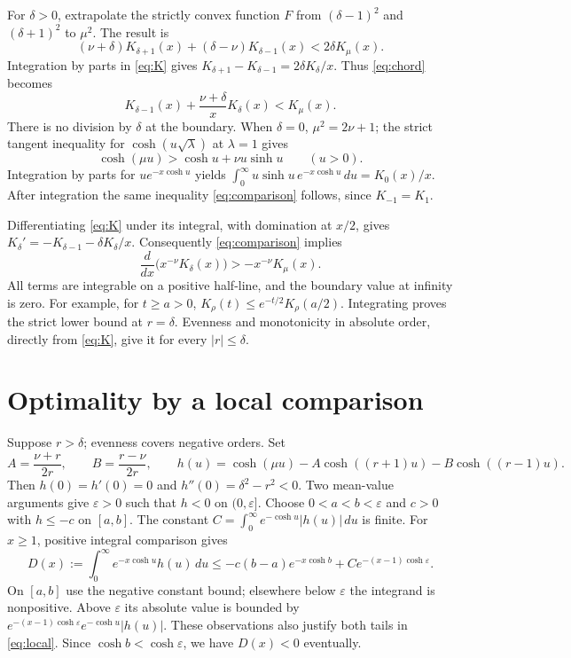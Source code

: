 \documentclass[11pt]{article}
\begin{document}
For $\delta>0$, extrapolate the strictly convex function $F$ from
$(\delta-1)^2$ and $(\delta+1)^2$ to $\mu^2$. The result is
\begin{equation}\label{eq:chord}
 (\nu+\delta)K_{\delta+1}(x)+(\delta-\nu)K_{\delta-1}(x)
       <2\delta K_\mu(x).
\end{equation}
Integration by parts in \eqref{eq:K} gives
$K_{\delta+1}-K_{\delta-1}=2\delta K_\delta/x$.
Thus \eqref{eq:chord} becomes
\begin{equation}\label{eq:comparison}
 K_{\delta-1}(x)+\frac{\nu+\delta}{x}K_\delta(x)<K_\mu(x).
\end{equation}
There is no division by $\delta$ at the boundary. When $\delta=0$,
$\mu^2=2\nu+1$; the strict tangent inequality for
$\cosh(u\sqrt\lambda)$ at $\lambda=1$ gives
\[
 \cosh(\mu u)>\cosh u+\nu u\sinh u \qquad(u>0).
\]
Integration by parts for $u e^{-x\cosh u}$ yields
$\int_0^\infty u\sinh u\,e^{-x\cosh u}\,du=K_0(x)/x$.
After integration the same inequality \eqref{eq:comparison} follows, since
$K_{-1}=K_1$.

Differentiating \eqref{eq:K} under its integral, with domination at $x/2$,
gives $K_\delta'=-K_{\delta-1}-\delta K_\delta/x$.
Consequently \eqref{eq:comparison} implies
\[
 \frac{d}{dx}\bigl(x^{-\nu}K_\delta(x)\bigr)>-x^{-\nu}K_\mu(x).
\]
All terms are integrable on a positive half-line, and the boundary value
at infinity is zero. For example, for $t\ge a>0$,
$K_\rho(t)\le e^{-t/2}K_\rho(a/2)$.
Integrating proves the strict lower bound at $r=\delta$.
Evenness and monotonicity in absolute order, directly from \eqref{eq:K},
give it for every $|r|\le\delta$.

\section{Optimality by a local comparison}
Suppose $r>\delta$; evenness covers negative orders. Set
\[
 A=\frac{\nu+r}{2r},\qquad B=\frac{r-\nu}{2r},\qquad
 h(u)=\cosh(\mu u)-A\cosh((r+1)u)-B\cosh((r-1)u).
\]
Then $h(0)=h'(0)=0$ and $h''(0)=\delta^2-r^2<0$.
Two mean-value arguments give $\varepsilon>0$ such that
$h<0$ on $(0,\varepsilon]$. Choose $0<a<b<\varepsilon$ and $c>0$
with $h\le-c$ on $[a,b]$. The constant
$C=\int_0^\infty e^{-\cosh u}|h(u)|\,du$ is finite.
For $x\ge1$, positive integral comparison gives
\begin{equation}\label{eq:local}
 D(x):=\int_0^\infty e^{-x\cosh u}h(u)\,du
 \le-c(b-a)e^{-x\cosh b}+C e^{-(x-1)\cosh\varepsilon}.
\end{equation}
On $[a,b]$ use the negative constant bound; elsewhere below $\varepsilon$
the integrand is nonpositive. Above $\varepsilon$ its absolute value is
bounded by $e^{-(x-1)\cosh\varepsilon}e^{-\cosh u}|h(u)|$.
These observations also justify both tails in \eqref{eq:local}.
Since $\cosh b<\cosh\varepsilon$, we have $D(x)<0$ eventually.
\end{document}
